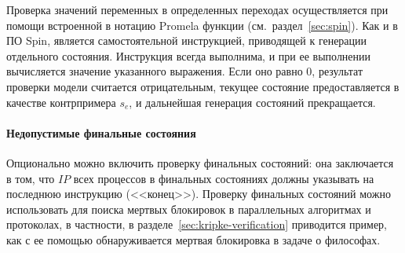 Проверка значений переменных в определенных переходах осуществляется при помощи встроенной
в нотацию Promela функции  (см.~раздел~\ref{sec:spin}). Как и в ПО Spin,
 является самостоятельной инструкцией, приводящей к генерации отдельного
состояния. Инструкция  всегда выполнима, и при ее выполнении вычисляется
значение указанного выражения. Если оно равно $0$, результат проверки модели считается
отрицательным, текущее состояние предоставляется в качестве контрпримера $s_e$, и
дальнейшая генерация состояний прекращается.

\paragraph{Недопустимые финальные состояния}
\label{sec:pml-endstates}

Опционально можно включить проверку финальных состояний: она заключается в том, что $IP$
всех процессов в финальных состояниях должны указывать на последнюю инструкцию
(<<конец>>). Проверку финальных состояний можно использовать для поиска мертвых блокировок
в параллельных алгоритмах и протоколах, в частности, в разделе~\ref{sec:kripke-verification}
приводится пример, как с ее помощью обнаруживается мертвая блокировка в задаче о
философах.




